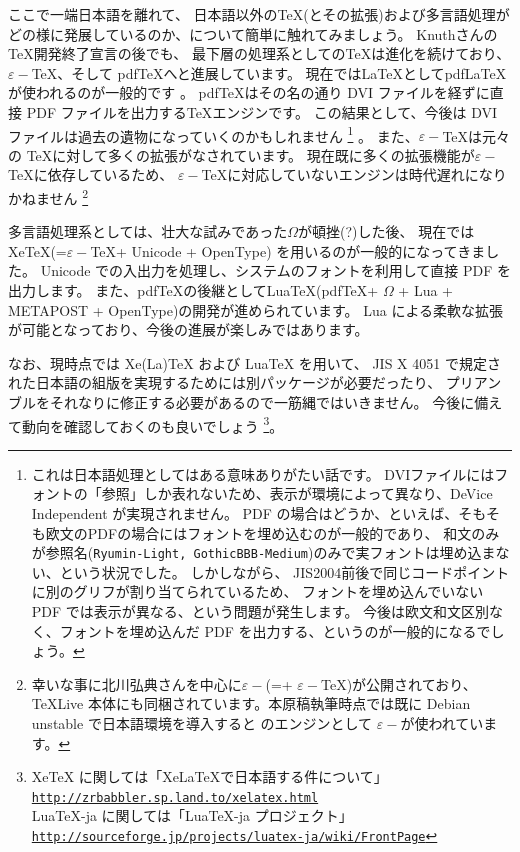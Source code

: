 \documentclass[mingoth,a4paper]{jsarticle}
\begin{document}
ここで一端日本語を離れて、
日本語以外の{\TeX}(とその拡張)および多言語処理がどの様に発展しているのか、について簡単に触れてみましょう。
%
Knuthさんの{\TeX}開発終了宣言の後でも、
最下層の処理系としての{\TeX}は進化を続けており、$\varepsilon-$\TeX、そして pdf\TeX へと進展しています。
現在では{\LaTeX}として{pdf\LaTeX}が使われるのが一般的です
。
pdf{\TeX}はその名の通り DVI ファイルを経ずに直接 PDF ファイルを出力する{\TeX}エンジンです。
この結果として、今後は DVI ファイルは過去の遺物になっていくのかもしれません
\footnote{
  これは日本語処理としてはある意味ありがたい話です。
  DVIファイルにはフォントの「参照」しか表れないため、表示が環境によって異なり、DeVice Independent が実現されません。
  PDF の場合はどうか、といえば、そもそも欧文のPDFの場合にはフォントを埋め込むのが一般的であり、
  和文のみが参照名({\tt{Ryumin-Light, GothicBBB-Medium}})のみで実フォントは埋め込まない、という状況でした。
  しかしながら、
  JIS2004前後で同じコードポイントに別のグリフが割り当てられているため、
  フォントを埋め込んでいない PDF では表示が異なる、という問題が発生します。
  今後は欧文和文区別なく、フォントを埋め込んだ PDF を出力する、というのが一般的になるでしょう。
}
。
また、$\varepsilon-$\TeX は元々の \TeX に対して多くの拡張がなされています。
現在既に多くの拡張機能が$\varepsilon-${\TeX}に依存しているため、
$\varepsilon-${\TeX}に対応していないエンジンは時代遅れになりかねません%
\footnote{%
  幸いな事に北川弘典さんを中心に$\varepsilon-$\pTeX(=\pTeX + $\varepsilon-$TeX)が公開されており、
  TeXLive 本体にも同梱されています。本原稿執筆時点では既に
  Debian unstable で日本語環境を導入すると \pLaTeX のエンジンとして $\varepsilon-$\pTeX が使われています。
}

多言語処理系としては、壮大な試みであった$\Omega$が頓挫(?)した後、
現在ではXeTeX(=$\varepsilon-$\TeX + Unicode + OpenType) を用いるのが一般的になってきました。
Unicode での入出力を処理し、システムのフォントを利用して直接 PDF を出力します。
%
また、pdf{\TeX}の後継としてLua{\TeX}(pdf\TeX + $\Omega$ + Lua + METAPOST + OpenType)の開発が進められています。
Lua による柔軟な拡張が可能となっており、今後の進展が楽しみではあります。

なお、現時点では Xe(La)TeX および LuaTeX を用いて、
JIS X 4051 で規定された日本語の組版を実現するためには別パッケージが必要だったり、
プリアンブルをそれなりに修正する必要があるので一筋縄ではいきません。
%
今後に備えて動向を確認しておくのも良いでしょう
\footnote{
  \noindent
  XeTeX に関しては「XeLaTeXで日本語する件について」{\tt{\url{http://zrbabbler.sp.land.to/xelatex.html}}} \\
  LuaTeX-ja に関しては「LuaTeX-ja プロジェクト」{\tt{\url{http://sourceforge.jp/projects/luatex-ja/wiki/FrontPage}}}
}。
\end{document}
